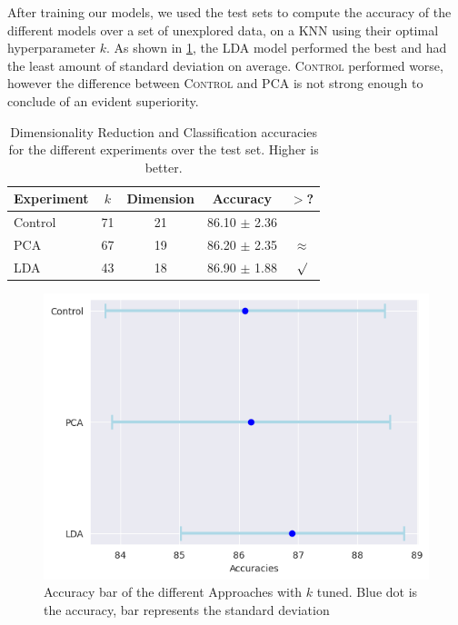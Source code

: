 	After training our models, we used the test sets to compute the accuracy of the different models over a set of unexplored data, on a KNN using their optimal hyperparameter $k$. As shown in \cref{results-table}, the \textsc{LDA} model performed the best and had the least amount of standard deviation on average. \textsc{Control} performed worse, however the difference between \textsc{Control} and \textsc{PCA} is not strong enough to conclude of an evident superiority.
	\begin{table}[ht]

		\begin{center}
			\begin{small}
				\begin{sc}
					\begin{tabular}{lcccc}
						\toprule
						Experiment & $k$ & Dimension & Accuracy         & $>$? \\
						\midrule
						Control    & 71  &    21     & 86.10 $\pm$ 2.36 & \\
						PCA		   & 67  &    19     & 86.20 $\pm$ 2.35 & $\approx$ \\
						LDA		   & 43  &    18     & 86.90 $\pm$ 1.88 & $\surd$ \\
						\bottomrule
					\end{tabular}
				\end{sc}
			\end{small}
		\end{center}
	\vskip -0.1in
	\caption{Dimensionality Reduction and Classification accuracies for the different experiments over the test set. Higher is better.}
	\label{results-table}
	\end{table}
	

	\begin{figure}[ht]
		\vskip 0.2in
		\begin{center}
			\centerline{\includegraphics[width=\columnwidth]{img/lda-pca-error.png}}
			\caption{Accuracy bar of the different Approaches with $k$ tuned. Blue dot is the accuracy, bar represents the standard deviation}
			\label{results-error}
		\end{center}
		\vskip -0.2in
	\end{figure}

